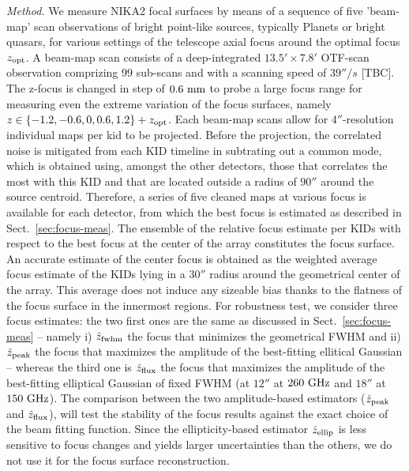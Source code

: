 \emph{Method. } We measure NIKA2 focal surfaces by means of a sequence of five 'beam-map'
scan observations of bright point-like sources, typically Planets or
bright quasars,
for various settings of the telescope axial focus around the
optimal focus $z_{\rm{opt}}$. A beam-map scan consists of a deep-integrated
$13.5' \times 7.8'$ OTF-scan observation comprizing $99$ sub-scans and
with a scanning speed of $39''/s$ [TBC]. The z-focus is changed in step of
$0.6~\rm{mm}$ to probe a large focus range for measuring even the
extreme variation of the focus surfaces,
namely $z \in \{-1.2, -0.6, 0, 0.6, 1.2 \} + z_{\rm{opt}}$.
Each beam-map scans allow for $4''$-resolution individual maps per kid to
be projected. Before the projection, the correlated noise is mitigated
from each KID timeline in subtrating out a common mode, which is obtained
using, amongst the other detectors, those that correlates the most
with this KID and that are located outside a radius of $90''$
around the source centroid.
Therefore, a series of five cleaned maps at various focus is
available for each detector, from which the best focus is estimated as
described in Sect.~\ref{sec:focus-meas}. The ensemble of the relative
focus estimate per KIDs with respect to the best focus at the center
of the array constitutes the focus surface. An accurate estimate of
the center focus is obtained as the
weighted average focus estimate of the KIDs lying in a $30''$ radius
around the geometrical center of the array. This average does not
induce any sizeable bias thanks to the flatness of the focus surface
in the innermost regions. For robustness test, we consider three focus
estimates: the two first ones are the same as discussed in
Sect.~\ref{sec:focus-meas} -- namely i) $\hat z_{\rm{fwhm}}$ the focus that
minimizes the geometrical FWHM and ii) $\hat z_{\rm{peak}}$ the focus
that maximizes the amplitude of the best-fitting ellitical Gaussian --
whereas the third one is $\hat z_{\rm{flux}}$ the focus that maximizes
the amplitude of the best-fitting elliptical Gaussian of fixed FWHM
(at $12''$ at $260~\rm{GHz}$ and $18''$ at $150~\rm{GHz}$). The 
comparison between the two amplitude-based estimators
($\hat z_{\rm{peak}}$ and $\hat z_{\rm{flux}}$), will test the
stability of the focus results against the exact choice of the beam fitting
function. Since the ellipticity-based estimator $\hat z_{\rm{ellip}}$ is
less sensitive to focus changes and yields larger uncertainties than the
others, we do not use it for the focus surface reconstruction.     


